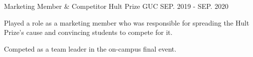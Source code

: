 

\begin{cventries}

  \cventry
    {Marketing Member \& Competitor} %
    {Hult Prize GUC} %
    {} %
    {SEP. 2019 - SEP. 2020} %
    {
      \begin{cvitems} %
        \item {Played a role as a marketing member who was responsible for spreading the Hult Prize’s cause and convincing students to compete for it.}
        \item {Competed as a team leader in the on-campus final event.}
      \end{cvitems}
    }

\end{cventries}

